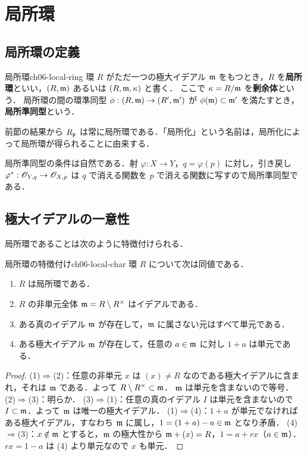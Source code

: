 \section{局所環}

\subsection{局所環の定義}

\begin{mydef}{局所環}{ch06-local-ring}
環 $R$ がただ一つの極大イデアル $\mathfrak{m}$ をもつとき，$R$ を\textbf{局所環}といい，$(R,\mathfrak{m})$ あるいは $(R,\mathfrak{m},\kappa)$ と書く．
ここで $\kappa=R/\mathfrak{m}$ を\textbf{剰余体}という．
局所環の間の環準同型 $\phi:(R,\mathfrak{m})\to(R',\mathfrak{m}')$ が $\phi(\mathfrak{m})\subset\mathfrak{m}'$ を満たすとき，\textbf{局所準同型}という．
\end{mydef}

前節の結果から $R_{\mathfrak{p}}$ は常に局所環である．「局所化」という名前は，局所化によって局所環が得られることに由来する．

局所準同型の条件は自然である．射 $\varphi:X\to Y$，$q=\varphi(p)$ に対し，引き戻し $\varphi^*:\mathscr{O}_{Y,q}\to\mathscr{O}_{X,p}$ は
$q$ で消える関数を $p$ で消える関数に写すので局所準同型である．

\subsection{極大イデアルの一意性}

局所環であることは次のように特徴付けられる．

\begin{myprop}{局所環の特徴付け}{ch06-local-char}
環 $R$ について次は同値である．
\begin{enumerate}
  \item $R$ は局所環である．
  \item $R$ の非単元全体 $\mathfrak{m}=R\setminus R^\times$ はイデアルである．
  \item ある真のイデアル $\mathfrak{m}$ が存在して，$\mathfrak{m}$ に属さない元はすべて単元である．
  \item ある極大イデアル $\mathfrak{m}$ が存在して，任意の $a\in\mathfrak{m}$ に対し $1+a$ は単元である．
\end{enumerate}
\end{myprop}

\begin{proof}
(1)$\Rightarrow$(2)：任意の非単元 $x$ は $(x)\neq R$ なのである極大イデアルに含まれ，それは $\mathfrak{m}$ である．よって $R\setminus R^\times\subset\mathfrak{m}$．
$\mathfrak{m}$ は単元を含まないので等号．
(2)$\Rightarrow$(3)：明らか．
(3)$\Rightarrow$(1)：任意の真のイデアル $I$ は単元を含まないので $I\subset\mathfrak{m}$．よって $\mathfrak{m}$ は唯一の極大イデアル．
(1)$\Rightarrow$(4)：$1+a$ が単元でなければある極大イデアル，すなわち $\mathfrak{m}$ に属し，$1=(1+a)-a\in\mathfrak{m}$ となり矛盾．
(4)$\Rightarrow$(3)：$x\notin\mathfrak{m}$ とすると，$\mathfrak{m}$ の極大性から $\mathfrak{m}+(x)=R$，$1=a+rx$（$a\in\mathfrak{m}$）．$rx=1-a$ は (4) より単元なので $x$ も単元．
\end{proof}

